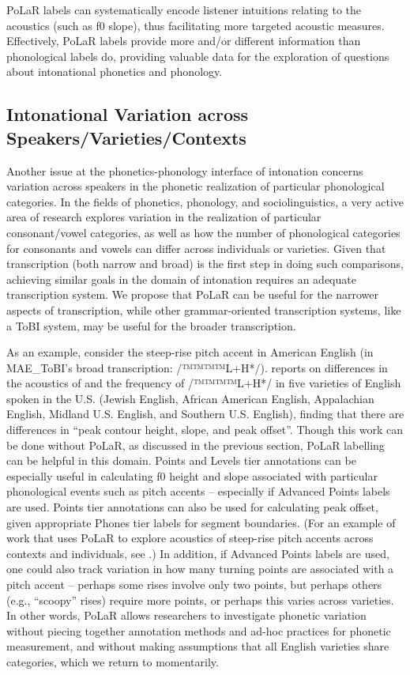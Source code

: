 \documentclass[11pt, twoside]{memoir}
\begin{document}
PoLaR labels can systematically encode listener intuitions relating to the acoustics (such as f0 slope), thus facilitating more targeted acoustic measures. Effectively, PoLaR labels provide more and/or different information than phonological labels do, providing valuable data for the exploration of questions about intonational phonetics and phonology.

\subsection{Intonational Variation across Speakers\slash Varieties\slash Contexts}\label{sec:interspeaker-variation-in-realization-of-prosodic-categories}

Another issue at the phonetics-phonology interface of intonation concerns variation across speakers in the phonetic realization of particular phonological categories. In the fields of phonetics, phonology, and sociolinguistics, a very active area of research explores variation in the realization of particular consonant\slash vowel categories, as well as how the number of phonological categories for consonants and vowels can differ across individuals or varieties. Given that transcription (both narrow and broad) is the first step in doing such comparisons, achieving similar goals in the domain of intonation requires an adequate transcription system. We propose that PoLaR can be useful for the narrower aspects of transcription, while other grammar-oriented transcription systems, like a ToBI system, may be useful for the broader transcription.

As an example, consider the steep-rise pitch accent in American English (in MAE\_ToBI’s broad transcription: /™™™™{L+H*}/). \citealt{burdin-18} reports on differences in the acoustics of and the frequency of /™™™™{L+H*}/ in five varieties of English spoken in the U.S. (Jewish English, African American English, Appalachian English, Midland U.S. English, and Southern U.S. English), finding that there are differences in “peak contour height, slope, and peak offset”. Though this work can be done without PoLaR, as discussed in the previous section, PoLaR labelling can be helpful in this domain. Points and Levels tier annotations can be especially useful in calculating f0 height and slope associated with particular phonological events such as pitch accents – especially if Advanced Points labels are used. Points tier annotations can also be used for calculating peak offset, given appropriate Phones tier labels for segment boundaries. (For an example of work that uses PoLaR to explore acoustics of steep-rise pitch accents across contexts and individuals, see \citealt{holliday21a}.)  In addition, if Advanced Points labels are used, one could also track variation in how many turning points are associated with a pitch accent – perhaps some rises involve only two points, but perhaps others (e.g., “scoopy” rises) require more points, or perhaps this varies across varieties. In other words, PoLaR allows researchers to investigate phonetic variation without piecing together annotation methods and ad-hoc practices for phonetic measurement, and without making assumptions that all English varieties share categories, which we return to momentarily.
\end{document}
